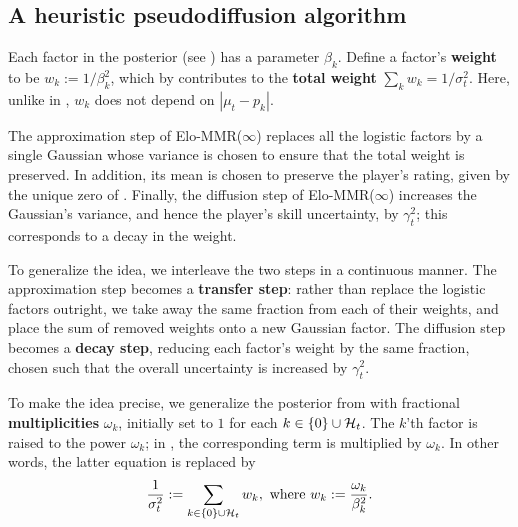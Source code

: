 \subsection{A heuristic pseudodiffusion algorithm}
\label{sec:pseudodiffusion}
Each factor in the posterior (see ) has a parameter $\beta_k$. Define a factor's \textbf{weight} to be $w_k := 1/\beta_k^2$, which by  contributes to the \textbf{total weight} $\sum_k w_k=1/\sigma_t^2$. Here, unlike in , $w_k$ does not depend on $|\mu_t-p_k|$.

The approximation step of Elo-MMR($\infty$) replaces all the logistic factors by a single Gaussian whose variance is chosen to ensure that the total weight is preserved. In addition, its mean is chosen to preserve the player's rating, given by the unique zero of . Finally, the diffusion step of Elo-MMR($\infty$) increases the Gaussian's variance, and hence the player's skill uncertainty, by $\gamma_t^2$; this corresponds to a decay in the weight.

To generalize the idea, we interleave the two steps in a continuous manner. The approximation step becomes a \textbf{transfer step}: rather than replace the logistic factors outright, we take away the same fraction from each of their weights, and place the sum of removed weights onto a new Gaussian factor. The diffusion step becomes a \textbf{decay step}, reducing each factor's weight by the same fraction, chosen such that the overall uncertainty is increased by $\gamma_t^2$.

To make the idea precise, we generalize the posterior from  with fractional \textbf{multiplicities} $\omega_k$, initially set to $1$ for each $k\in\{0\}\cup{\mathcal{H}}_t$. The $k$'th factor is raised to the power $\omega_k$; in , the corresponding term is multiplied by $\omega_k$. In other words, the latter equation is replaced by
\[\frac{1}{\sigma_t^2} := \sum_{k\in\{0\}\cup{\mathcal{H}}_t}w_k,\text{ where }w_k := \frac{\omega_k}{\beta_k^2}.\]

